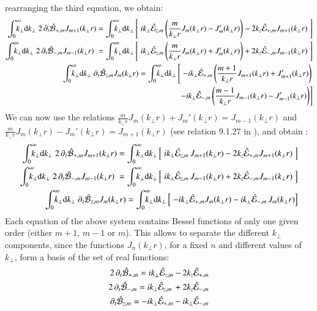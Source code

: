 rearranging the third equation, we obtain:
\begin{align*}
\RInteg{k_\perp } \; 2 \,\partial_t \spectral{B}_{+,m}  J_{m+1}(k_\perp r) =
\RInteg{k_\perp } \left[ \; ik_\perp \spectral{E}_{z,m} \left( \frac{m}{k_\perp r} J_m(k_\perp r) -
    J_m'(k_\perp r) \right) -2 k_z\spectral{E}_{+,m}J_{m+1}(k_\perp r) \;
\right] \\
\RInteg{k_\perp } \; 2\, \partial_t \spectral{B}_{-,m}  J_{m-1}(k_\perp r) \; =
\RInteg{k_\perp } \left[ \;
   ik_\perp \spectral{E}_{z,m} \left( \frac{m}{k_\perp r} J_m(k_\perp r) +
    J_m'(k_\perp r) \right)  + 2k_z\spectral{E}_{-,m}J_{m-1}(k_\perp r) \;
\right] \\
\RInteg{k_\perp }\; \partial_t \spectral{B}_{z,m}  J_{m}(k_\perp r) =
\RInteg{k_\perp } \left[ \; -ik_\perp \spectral{E}_{+,m}\left(\frac{m+1}{k_\perp r}J_{m+1}(k_\perp r) +
    J_{m+1}'(k_\perp r) \right) \right.\\
\qquad \left. - ik_\perp \spectral{E}_{-,m}\left(\frac{m-1}{k_\perp r}J_{m-1}(k_\perp r) -
    J_{m-1}'(k_\perp r) \right) \right] 
\end{align*}
We can now use the relations $\frac{m}{k_\perp r} J_m(k_\perp r) +
    J_m'(k_\perp r) = J_{m-1}(k_\perp r)$ and $\frac{m}{k_\perp r} J_m(k_\perp r) -
    J_m'(k_\perp r) = J_{m+1}(k_\perp r)$ (see relation 9.1.27 in
    \cite{Abramowitz}), and obtain :
\begin{align*}
\RInteg{k_\perp } \; 2 \,\partial_t \spectral{B}_{+,m}  J_{m+1}(k_\perp r) =
\RInteg{k_\perp } \left[ \; ik_\perp \spectral{E}_{z,m}\,
    J_{m+1}(k_\perp r) -2 k_z\spectral{E}_{+,m}J_{m+1}(k_\perp r) \;
\right] \\
\RInteg{k_\perp } \; 2\, \partial_t \spectral{B}_{-,m}  J_{m-1}(k_\perp r) \; =
\RInteg{k_\perp } \left[ \;
   ik_\perp \spectral{E}_{z,m} \,
    J_{m-1}(k_\perp r) + 2k_z\spectral{E}_{-,m}J_{m-1}(k_\perp r) \;
\right] \\
\RInteg{k_\perp }\; \partial_t \spectral{B}_{z,m}  J_{m}(k_\perp r) =
\RInteg{k_\perp } \left[ \; -ik_\perp \spectral{E}_{+,m} J_{m}(k_\perp r) - ik_\perp \spectral{E}_{-,m}\,J_{m}(k_\perp r) \right] 
\end{align*}
Each equation of the above system contains Bessel functions of only one
given order (either $m+1$, $m-1$ or $m$). This allows to separate the
different $k_\perp $ components, since the functions $J_n(k_\perp r)$, for a
fixed $n$ and different values of $k_\perp $, form a basis of the set of real functions:
\begin{align*}
2 \,\partial_t \hat{\mathcal{B}}_{+,m} =
ik_\perp \hat{\mathcal{E}}_{z,m} -2 k_z\hat{\mathcal{E}}_{+,m} \\
2\, \partial_t \hat{\mathcal{B}}_{-,m} = ik_\perp \hat{\mathcal{E}}_{z,m} \,
    + 2k_z\hat{\mathcal{E}}_{-,m} \\
 \partial_t \hat{\mathcal{B}}_{z,m} = -ik_\perp \hat{\mathcal{E}}_{+,m}  - ik_\perp \hat{\mathcal{E}}_{-,m}
\end{align*}

